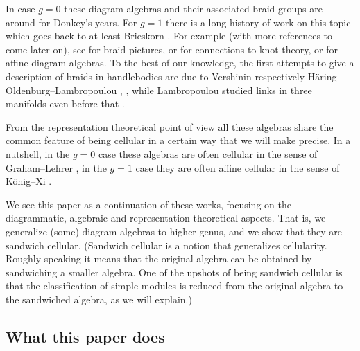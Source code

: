 \documentclass[a4paper,11pt]{amsart}
\numberwithin{equation}{section}
\begin{document}
In case $g=0$ these diagram algebras and their associated 
braid groups are around for Donkey's years. 
For $g=1$ there is a long history of work on this topic which 
goes back to at least Brieskorn \cite{Brieskorn}.
For example (with more references to come later on), see
\cite{allcock} for braid pictures, \cite{Geck-Lambropoulou} or \cite{OrRa-affine-braids} for connections 
to knot theory, \cite{Gr-gen-tl-algebra} 
or \cite{HaOl-cyclotomic-bmw} for affine diagram algebras.
To the best of our knowledge, the first attempts to give a
description of braids in handlebodies are due to Vershinin \cite{Ve-handlebodies}
respectively H{\"a}ring-Oldenburg--Lambropoulou \cite{La-handlebodies}, \cite{HaOlLa-handlebodies}, 
while Lambropoulou studied links in three manifolds even before that \cite{La-PhDThesis}.

From the representation theoretical point of view all these 
algebras share the common feature of being cellular in a certain way
that we will make precise. In a nutshell, in the $g=0$ case 
these algebras are often cellular in the sense of Graham--Lehrer \cite{GrLe-cellular}, 
in the $g=1$ case they are often affine cellular in the sense of K{\"o}nig--Xi \cite{KoXi-affine-cellular}.

We see this paper as a continuation of these works, focusing on the diagrammatic, 
algebraic and representation theoretical aspects. That is, we generalize 
(some) diagram algebras to higher genus, and 
we show that they are sandwich cellular.
(Sandwich cellular is a notion that 
generalizes cellularity. Roughly speaking it means that the original 
algebra can be obtained by sandwiching a smaller algebra.
One of the upshots of being sandwich cellular is that the 
classification of simple modules is reduced 
from the original algebra to the sandwiched algebra, 
as we will explain.)

\subsection{What this paper does}
\end{document}
